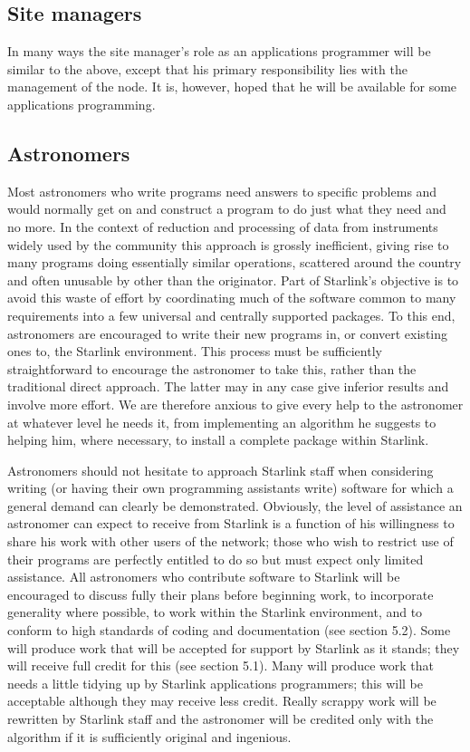 \subsection {Site managers}
In many ways the site manager's role as an applications programmer will be
similar to the above, except that his primary responsibility lies with the
management of the node.
It is, however, hoped that he will be available for some applications
programming.
\subsection {Astronomers}
Most astronomers who write programs need answers to specific problems and would
normally get on and construct a program to do just what they need and no more.
In the context of reduction and processing of data from instruments widely used
by the community this approach is grossly inefficient, giving rise to many
programs doing essentially similar operations, scattered around the country and
often unusable by other than the originator.
Part of Starlink's objective is to avoid this waste of effort by coordinating
much of the software common to many requirements into a few universal and
centrally supported packages.
To this end, astronomers are encouraged to write their new programs in, or
convert existing ones to, the Starlink environment.
This process must be sufficiently straightforward to encourage the astronomer
to take this, rather than the traditional direct approach.
The latter may in any case give inferior results and involve more effort.
We are therefore anxious to give every help to the astronomer at whatever level
he needs it, from implementing an algorithm he suggests to helping him, where
necessary, to install a complete package within Starlink.  

Astronomers should not hesitate to approach Starlink staff when considering
writing (or having their own programming assistants write) software for which a
general demand can clearly be demonstrated.
Obviously, the level of assistance an astronomer can expect to receive from
Starlink is a function of his willingness to share his work with other users of
the network; those who wish to restrict use of their programs are perfectly
entitled to do so but must expect only limited assistance.
All astronomers who contribute software to Starlink will be encouraged to
discuss fully their plans before beginning work, to incorporate generality
where possible, to work within the Starlink environment, and to conform to
high standards of coding and documentation (see section 5.2).
Some will produce work that will be accepted for support by Starlink as it
stands; they will receive full credit for this (see section 5.1).
Many will produce work that needs a little tidying up by Starlink applications
programmers; this will be acceptable although they may receive less credit.
Really scrappy work will be rewritten by Starlink staff and the astronomer will
be credited only with the algorithm if it is sufficiently original and
ingenious.
